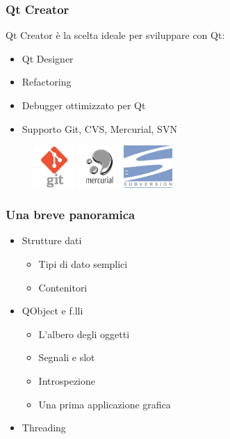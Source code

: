 \documentclass[10pt]{beamer}
\begin{document}
\begin{frame}
	\frametitle{Qt Creator}
	Qt Creator è la scelta ideale per sviluppare con Qt:
	\begin{itemize}
		\item Qt Designer
		\item Refactoring
		\item Debugger ottimizzato per Qt
		\item Supporto Git, CVS, Mercurial, SVN
	\end{itemize}
	\vspace{0.5cm}
	\begin{figure}
		\includegraphics[height=1.6cm]{images/git.png}
		\qquad
		\includegraphics[height=1.6cm]{images/hg.png}
		\qquad
		\includegraphics[height=1.6cm]{images/svn.png}
	\end{figure}
\end{frame}

\begin{frame}
	\frametitle{Una breve panoramica}
	\begin{block}{}
		\begin{itemize}
			\item Strutture dati
			\begin{itemize}
				\item Tipi di dato semplici
				\item Contenitori
			\end{itemize}
			\item QObject e f.lli
			\begin{itemize}
				\item L'albero degli oggetti
				\item Segnali e slot
				\item Introspezione
				\item Una prima applicazione grafica
			\end{itemize}
			\item Threading
		\end{itemize}
	\end{block}
\end{frame}
\end{document}
